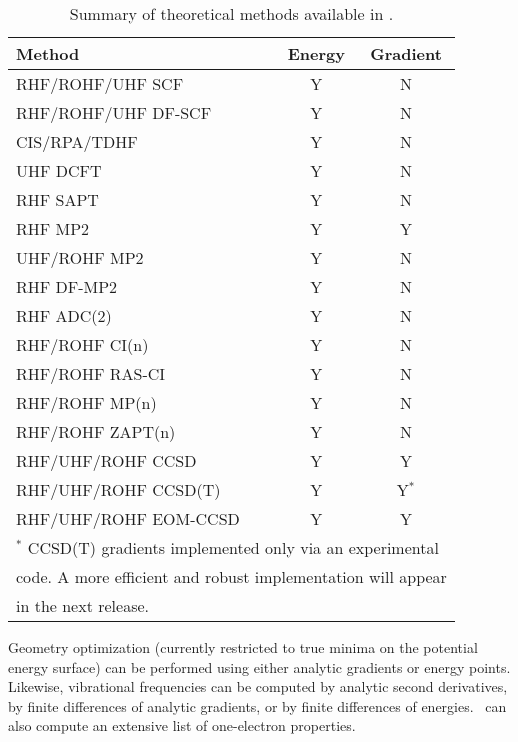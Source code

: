 \begin{table}
\caption{Summary of theoretical methods available in \PSIfour.} \label{table:methods}
\parsep 10pt
\begin{center}
\begin{tabular}{lcc} \hline\hline
Method                & Energy & Gradient \\ \hline
RHF/ROHF/UHF SCF     & Y & N \\
RHF/ROHF/UHF DF-SCF   & Y & N \\
CIS/RPA/TDHF          & Y & N \\
UHF DCFT              & Y & N \\
RHF SAPT              & Y & N \\
RHF MP2               & Y & Y \\
UHF/ROHF MP2          & Y & N \\
RHF DF-MP2            & Y & N \\
RHF ADC(2)            & Y & N \\
RHF/ROHF CI(n)        & Y & N \\
RHF/ROHF RAS-CI       & Y & N \\
RHF/ROHF MP(n)        & Y & N \\
RHF/ROHF ZAPT(n)      & Y & N \\
RHF/UHF/ROHF CCSD     & Y & Y \\
RHF/UHF/ROHF CCSD(T)  & Y & Y$^*$ \\
RHF/UHF/ROHF EOM-CCSD & Y & Y \\
\hline\hline
\multicolumn{3}{l}{
\footnotesize{$^*$ CCSD(T) gradients implemented only via an experimental}} \\
\multicolumn{3}{l}{
\footnotesize{code.  A more efficient and robust implementation will
appear}} \\
\multicolumn{3}{l}{\footnotesize{in the next release.}}
\end{tabular}
\end{center}
\end{table}
Geometry optimization (currently restricted to true minima on the potential
energy surface) can be performed using either analytic gradients
or energy points.  Likewise, vibrational frequencies can be 
computed by analytic second derivatives, by finite
differences of analytic gradients, or by finite differences of energies.
\PSIfour\ can also compute an extensive list of one-electron properties.

